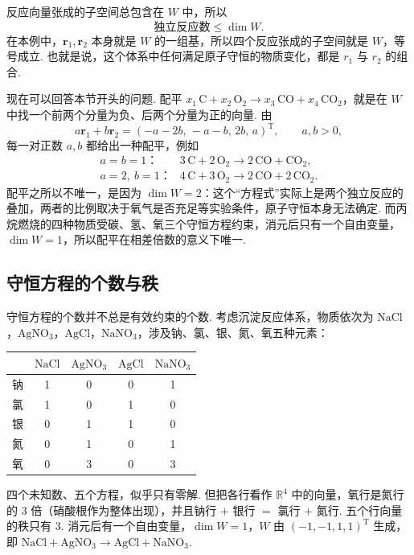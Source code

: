 \documentclass[lang=cn,10.5pt,scheme=chinese,toc=twocol,section,chinesefont=nofont,
twoside,citestyle=gb7714-2015,bibstyle=gb7714-2015]{elegantbook}
\DeclareRobustCommand{\textbf}[1]{{\lnsemiboldlatin\lnsemiboldcjk #1}}
\newcommand{\vv}[1]{\boldsymbol{#1}}
\newcommand{\trans}{\mathrm{T}}             %
\numberwithin{equation}{section}   %
\begin{document}
反应向量张成的子空间总包含在 $W$ 中，所以
\[
  \text{独立反应数}\le\dim W.
\]
在本例中，$\vv r_1,\vv r_2$ 本身就是 $W$ 的一组基，所以四个反应张成的子空间就是 $W$，等号成立. 也就是说，这个体系中\textbf{任何}满足原子守恒的物质变化，都是 $r_1$ 与 $r_2$ 的组合.

现在可以回答本节开头的问题. 配平 $x_1\,\mathrm{C}+x_2\,\mathrm{O_2}\to x_3\,\mathrm{CO}+x_4\,\mathrm{CO_2}$，就是在 $W$ 中找一个前两个分量为负、后两个分量为正的向量. 由
\[
  a\vv r_1+b\vv r_2=(-a-2b,\,-a-b,\,2b,\,a)^\trans,\qquad a,b>0,
\]
每一对正数 $a,b$ 都给出一种配平，例如
\[
  \begin{array}{ll}
    a=b=1\text{：}     & 3\,\mathrm{C}+2\,\mathrm{O_2}\to2\,\mathrm{CO}+\mathrm{CO_2},    \\
    a=2,\ b=1\text{：} & 4\,\mathrm{C}+3\,\mathrm{O_2}\to2\,\mathrm{CO}+2\,\mathrm{CO_2}.
  \end{array}
\]
配平之所以不唯一，是因为 $\dim W=2$：这个“方程式”实际上是两个独立反应的叠加，两者的比例取决于氧气是否充足等实验条件，原子守恒本身无法确定. 而丙烷燃烧的四种物质受碳、氢、氧三个守恒方程约束，消元后只有一个自由变量，$\dim W=1$，所以配平在相差倍数的意义下唯一.

\subsection{守恒方程的个数与秩}

守恒方程的个数并不总是有效约束的个数. 考虑沉淀反应体系，物质依次为 $\mathrm{NaCl}$，$\mathrm{AgNO_3}$，$\mathrm{AgCl}$，$\mathrm{NaNO_3}$，涉及钠、氯、银、氮、氧五种元素：
\begin{center}
  \begin{tabular}{c|cccc}
      & $\mathrm{NaCl}$ & $\mathrm{AgNO_3}$ & $\mathrm{AgCl}$ & $\mathrm{NaNO_3}$ \\
    \hline
    钠 & 1               & 0                 & 0               & 1                 \\
    氯 & 1               & 0                 & 1               & 0                 \\
    银 & 0               & 1                 & 1               & 0                 \\
    氮 & 0               & 1                 & 0               & 1                 \\
    氧 & 0               & 3                 & 0               & 3
  \end{tabular}
\end{center}
四个未知数、五个方程，似乎只有零解. 但把各行看作 $\mathbb{R}^4$ 中的向量，氧行是氮行的 $3$ 倍（硝酸根作为整体出现），并且钠行 $+$ 银行 $=$ 氯行 $+$ 氮行. 五个行向量的秩只有 $3$. 消元后有一个自由变量，$\dim W=1$，$W$ 由 $(-1,-1,1,1)^\trans$ 生成，即 $\mathrm{NaCl}+\mathrm{AgNO_3}\to\mathrm{AgCl}+\mathrm{NaNO_3}$.
\end{document}
